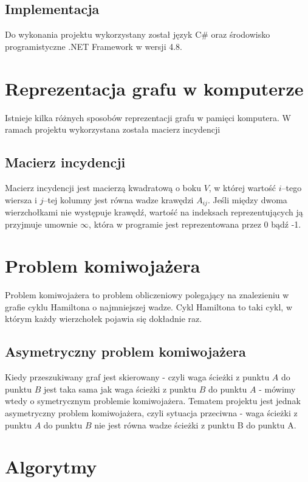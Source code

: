 \documentclass{article}
\begin{document}
\subsection{Implementacja}
Do wykonania projektu wykorzystany został język C\# oraz środowisko programistyczne .NET Framework w wersji 4.8.


\section{Reprezentacja grafu w komputerze}
Istnieje kilka różnych sposobów reprezentacji grafu w pamięci komputera. W ramach projektu wykorzystana została macierz incydencji
\subsection{Macierz incydencji}
Macierz incydencji jest macierzą kwadratową o boku $V$, w której wartość $i$–tego wiersza i $j$–tej kolumny jest równa wadze krawędzi $A_{ij}$. Jeśli między dwoma wierzchołkami nie występuje krawędź, wartość na indeksach reprezentujących ją przyjmuje umownie $\infty$, która w programie jest reprezentowana przez 0 bądź -1.




\section{Problem komiwojażera}
Problem komiwojażera to problem obliczeniowy polegający na znalezieniu w grafie cyklu Hamiltona o najmniejszej wadze. Cykl Hamiltona to taki cykl, w którym każdy wierzchołek pojawia się dokładnie raz. 

\subsection{Asymetryczny problem komiwojażera}
Kiedy przeszukiwany graf jest skierowany - czyli waga ścieżki z punktu $A$ do punktu $B$ jest taka sama jak waga ścieżki z punktu $B$ do punktu $A$
 - mówimy wtedy o symetrycznym problemie komiwojażera. Tematem projektu jest jednak asymetryczny problem komiwojażera, czyli sytuacja przeciwna - waga ścieżki z punktu $A$ do punktu $B$ nie jest równa wadze ścieżki z punktu B do punktu A.



\newpage

\section{Algorytmy}
\end{document}
